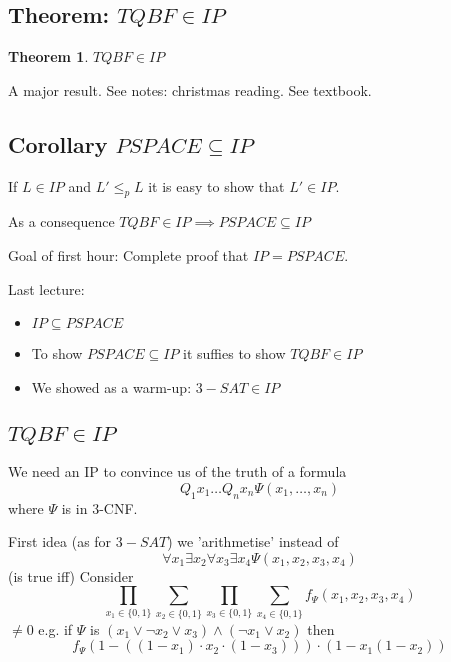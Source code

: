 \documentclass[a4paper,12pt]{article}
\theoremstyle{definition}
\newtheorem{theorem}[counter]{Theorem}
\theoremstyle{remark}
\begin{document}
\subsection{Theorem: $TQBF \in IP$}
\begin{theorem}
    $TQBF \in IP$
\end{theorem}
A major result. See notes: christmas reading. See textbook.
\subsection*{Corollary $PSPACE \subseteq IP$}
If $L \in IP$ and $L' \leq_p L$ it is easy to show that $L' \in IP$.

As a consequence $TQBF \in IP \implies PSPACE \subseteq IP$







\newpage
Goal of first hour: Complete proof that $IP = PSPACE$.

Last lecture:
\begin{itemize}
    \item $IP \subseteq PSPACE$
    \item To show $PSPACE \subseteq IP$ it suffies to show $TQBF \in IP$
    \item We showed as a warm-up: $3-SAT \in IP$
\end{itemize}

\subsection{$TQBF \in IP$}
We need an IP to convince us of the truth of a formula
\begin{equation*}
    Q_1 x_1 \dots Q_n x_n \Psi (x_1, \dots, x_n)
\end{equation*}
where $\Psi$ is in 3-CNF.

First idea (as for $3-SAT$) we 'arithmetise' instead of 
\begin{equation*}
    \forall x_1 \exists x_2 \forall x_3 \exists x_4 \Psi (x_1, x_2, x_3, x_4)
\end{equation*}
(is true iff)
Consider
\begin{equation*}
    \prod_{x_1 \in \{0, 1\}} \sum_{x_2 \in \{0, 1\}} \prod_{x_3 \in \{0, 1\}} \sum_{x_4 \in \{0, 1\}} f_\Psi (x_1, x_2, x_3, x_4)
\end{equation*}
$ \neq 0$
e.g. if $\Psi$ is $(x_1 \lor \neg x_2 \lor x_3) \land (\neg x_1 \lor x_2)$ then
\begin{equation*}
    f_\Psi (1 - ((1 - x_1) \cdot x_2 \cdot (1 - x_3))) \cdot (1 - x_1 (1 - x_2))
\end{equation*}
\end{document}
